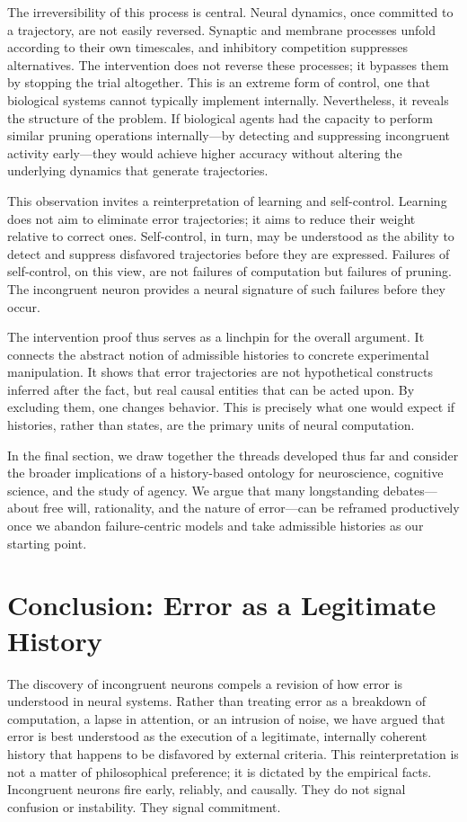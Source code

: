 \documentclass[11pt]{article}
\begin{document}
The irreversibility of this process is central. Neural dynamics, once committed to a trajectory, are not easily reversed. Synaptic and membrane processes unfold according to their own timescales, and inhibitory competition suppresses alternatives. The intervention does not reverse these processes; it bypasses them by stopping the trial altogether. This is an extreme form of control, one that biological systems cannot typically implement internally. Nevertheless, it reveals the structure of the problem. If biological agents had the capacity to perform similar pruning operations internally—by detecting and suppressing incongruent activity early—they would achieve higher accuracy without altering the underlying dynamics that generate trajectories.

This observation invites a reinterpretation of learning and self-control. Learning does not aim to eliminate error trajectories; it aims to reduce their weight relative to correct ones. Self-control, in turn, may be understood as the ability to detect and suppress disfavored trajectories before they are expressed. Failures of self-control, on this view, are not failures of computation but failures of pruning. The incongruent neuron provides a neural signature of such failures before they occur.

The intervention proof thus serves as a linchpin for the overall argument. It connects the abstract notion of admissible histories to concrete experimental manipulation. It shows that error trajectories are not hypothetical constructs inferred after the fact, but real causal entities that can be acted upon. By excluding them, one changes behavior. This is precisely what one would expect if histories, rather than states, are the primary units of neural computation.

In the final section, we draw together the threads developed thus far and consider the broader implications of a history-based ontology for neuroscience, cognitive science, and the study of agency. We argue that many longstanding debates—about free will, rationality, and the nature of error—can be reframed productively once we abandon failure-centric models and take admissible histories as our starting point.

\section{Conclusion: Error as a Legitimate History}

The discovery of incongruent neurons compels a revision of how error is understood in neural systems. Rather than treating error as a breakdown of computation, a lapse in attention, or an intrusion of noise, we have argued that error is best understood as the execution of a legitimate, internally coherent history that happens to be disfavored by external criteria. This reinterpretation is not a matter of philosophical preference; it is dictated by the empirical facts. Incongruent neurons fire early, reliably, and causally. They do not signal confusion or instability. They signal commitment.
\end{document}
